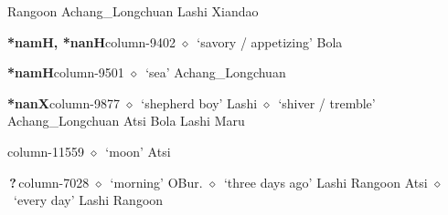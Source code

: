          Rangoon 
\hspace{1ex}
         Achang\_Longchuan 
\hspace{1ex}
         Lashi 
\hspace{1ex}
         Xiandao 
  \item {\footnotesize \textbf{*namH, *nanH}}{\tiny column-9402}
         $\diamond$~`savory / appetizing'
         Bola 
  \item {\footnotesize \textbf{*namH}}{\tiny column-9501}
         $\diamond$~`sea'
         Achang\_Longchuan 
  \item {\footnotesize \textbf{*nanX}}{\tiny column-9877}
         $\diamond$~`shepherd boy'
         Lashi 
\hspace{1ex}
         $\diamond$~`shiver / tremble'
         Achang\_Longchuan 
\hspace{1ex}
         Atsi 
\hspace{1ex}
         Bola 
\hspace{1ex}
         Lashi 
\hspace{1ex}
         Maru 
  \item {\footnotesize \textbf{}}{\tiny column-11559}
         $\diamond$~`moon'
         Atsi 
  \item {\footnotesize \textbf{\,?\,}}{\tiny column-7028}
         $\diamond$~`morning'
         OBur. 
\hspace{1ex}
         $\diamond$~`three days ago'
         Lashi 
\hspace{1ex}
         Rangoon 
\hspace{1ex}
         Atsi 
\hspace{1ex}
         $\diamond$~`every day'
         Lashi 
\hspace{1ex}
         Rangoon 
